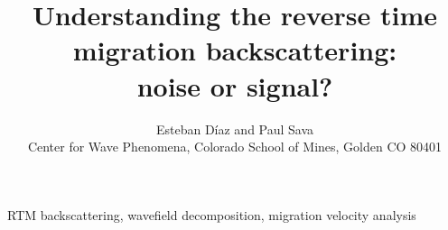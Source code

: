 



\author[E.~D\'{i}az and P.~Sava]{Esteban D\'{i}az and Paul Sava\\ 
Center for Wave Phenomena,  
Colorado School of Mines, Golden CO 80401}

\title[Understanding RTM backscattering]{Understanding the reverse time migration backscattering:\\ noise or signal?}
\maketitle





\begin{keywords}
RTM backscattering, wavefield decomposition, migration velocity analysis
\end{keywords}






